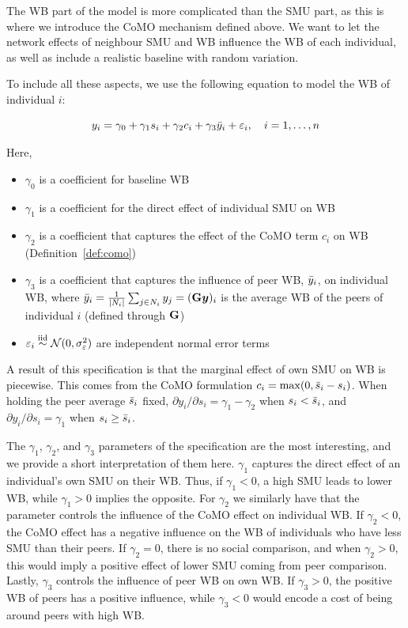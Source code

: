 The WB part of the model is more complicated than the SMU part, as this is where we introduce the CoMO mechanism defined above. We want to let the network effects of neighbour SMU and WB influence the WB of each individual, as well as include a realistic baseline with random variation.

To include all these aspects, we use the following equation to model the WB of individual $i$:

\begin{equation}
\label{eq:wellbeing}
    y_i = \gamma_0 + \gamma_1 s_i + \gamma_2 c_i + \gamma_3 \bar{y}_i
        + \varepsilon_i, \quad i = 1, \ldots, n
\end{equation}

Here,

\begin{itemize}
    \item $\gamma_0$ is a coefficient for baseline WB
    \item $\gamma_1$ is a coefficient for the direct effect of individual SMU on WB
    \item $\gamma_2$ is a coefficient that captures the effect of the CoMO term $c_i$ on WB (Definition~\ref{def:como})
    \item $\gamma_3$ is a coefficient that captures the influence of peer WB, $\bar{y}_i$, on individual WB, where $\bar{y}_i = \frac{1}{|N_i|}\sum_{j \in N_i} y_j = (\mathbf{G}\bm{y})_i$ is the average WB of the peers of individual $i$ (defined through $\mathbf{G}$)
    \item $\varepsilon_i \stackrel{\text{iid}}{\sim} \mathcal{N}(0, \sigma_\varepsilon^2)$ are independent normal error terms
\end{itemize}

A result of this specification is that the marginal effect of own SMU on WB is piecewise. This comes from the CoMO formulation $c_i = \max(0, \bar{s}_i - s_i)$. When holding the peer average $\bar{s}_i$ fixed, $\partial y_i / \partial s_i = \gamma_1 - \gamma_2$ when $s_i < \bar{s}_i$, and $\partial y_i / \partial s_i = \gamma_1$ when $s_i \geq \bar{s}_i$.

The $\gamma_1$, $\gamma_2$, and $\gamma_3$ parameters of the specification are the most interesting, and we provide a short interpretation of them here. $\gamma_1$ captures the direct effect of an individual's own SMU on their WB\@. Thus, if $\gamma_1 < 0$, a high SMU leads to lower WB, while $\gamma_1 > 0$ implies the opposite. For $\gamma_2$ we similarly have that the parameter controls the influence of the CoMO effect on individual WB\@. If $\gamma_2 < 0$, the CoMO effect has a negative influence on the WB of individuals who have less SMU than their peers. If $\gamma_2 = 0$, there is no social comparison, and when $\gamma_2 > 0$, this would imply a positive effect of lower SMU coming from peer comparison. Lastly, $\gamma_3$ controls the influence of peer WB on own WB\@. If $\gamma_3 > 0$, the positive WB of peers has a positive influence, while $\gamma_3 < 0$ would encode a cost of being around peers with high WB\@.

